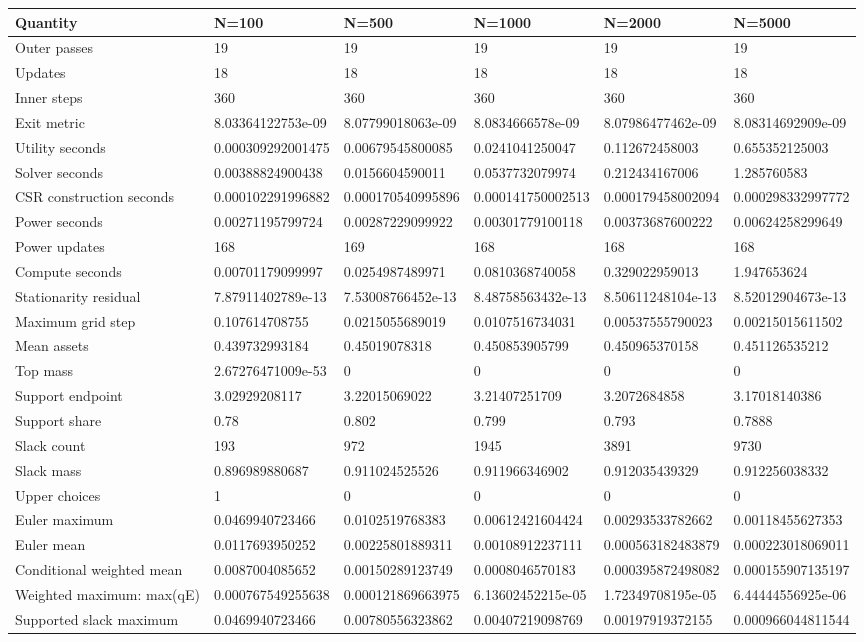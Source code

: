 \begin{tabular}{llllll}
\hline
Quantity & N=100 & N=500 & N=1000 & N=2000 & N=5000 \\
\hline
Outer passes & 19 & 19 & 19 & 19 & 19 \\
Updates & 18 & 18 & 18 & 18 & 18 \\
Inner steps & 360 & 360 & 360 & 360 & 360 \\
Exit metric & 8.03364122753e-09 & 8.07799018063e-09 & 8.0834666578e-09 & 8.07986477462e-09 & 8.08314692909e-09 \\
Utility seconds & 0.000309292001475 & 0.00679545800085 & 0.0241041250047 & 0.112672458003 & 0.655352125003 \\
Solver seconds & 0.00388824900438 & 0.0156604590011 & 0.0537732079974 & 0.212434167006 & 1.285760583 \\
CSR construction seconds & 0.000102291996882 & 0.000170540995896 & 0.000141750002513 & 0.000179458002094 & 0.000298332997772 \\
Power seconds & 0.00271195799724 & 0.00287229099922 & 0.00301779100118 & 0.00373687600222 & 0.00624258299649 \\
Power updates & 168 & 169 & 168 & 168 & 168 \\
Compute seconds & 0.00701179099997 & 0.0254987489971 & 0.0810368740058 & 0.329022959013 & 1.947653624 \\
Stationarity residual & 7.87911402789e-13 & 7.53008766452e-13 & 8.48758563432e-13 & 8.50611248104e-13 & 8.52012904673e-13 \\
Maximum grid step & 0.107614708755 & 0.0215055689019 & 0.0107516734031 & 0.00537555790023 & 0.00215015611502 \\
Mean assets & 0.439732993184 & 0.45019078318 & 0.450853905799 & 0.450965370158 & 0.451126535212 \\
Top mass & 2.67276471009e-53 & 0 & 0 & 0 & 0 \\
Support endpoint & 3.02929208117 & 3.22015069022 & 3.21407251709 & 3.2072684858 & 3.17018140386 \\
Support share & 0.78 & 0.802 & 0.799 & 0.793 & 0.7888 \\
Slack count & 193 & 972 & 1945 & 3891 & 9730 \\
Slack mass & 0.896989880687 & 0.911024525526 & 0.911966346902 & 0.912035439329 & 0.912256038332 \\
Upper choices & 1 & 0 & 0 & 0 & 0 \\
Euler maximum & 0.0469940723466 & 0.0102519768383 & 0.00612421604424 & 0.00293533782662 & 0.00118455627353 \\
Euler mean & 0.0117693950252 & 0.00225801889311 & 0.00108912237111 & 0.000563182483879 & 0.000223018069011 \\
Conditional weighted mean & 0.0087004085652 & 0.00150289123749 & 0.0008046570183 & 0.000395872498082 & 0.000155907135197 \\
Weighted maximum: max(qE) & 0.000767549255638 & 0.000121869663975 & 6.13602452215e-05 & 1.72349708195e-05 & 6.44444556925e-06 \\
Supported slack maximum & 0.0469940723466 & 0.00780556323862 & 0.00407219098769 & 0.00197919372155 & 0.000966044811544 \\
\hline
\end{tabular}
